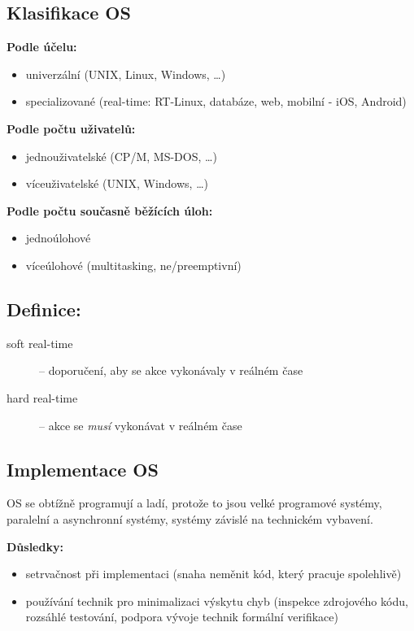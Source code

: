 \documentclass[a4paper, 11pt]{article}
\begin{document}
\newpage

\subsection{Klasifikace OS}

\textbf{Podle účelu:}
\begin{itemize}
    \item univerzální (UNIX, Linux, Windows, \ldots)
    \item specializované (real-time: RT-Linux, databáze, web, mobilní - iOS, Android)
\end{itemize}

\textbf{Podle počtu uživatelů:}
\begin{itemize}
    \item jednouživatelské (CP/M, MS-DOS, \ldots)
    \item víceuživatelské (UNIX, Windows, \ldots)
\end{itemize}

\textbf{Podle počtu současně běžících úloh:}
\begin{itemize}
    \item jednoúlohové
    \item víceúlohové (multitasking, ne/preemptivní)
\end{itemize}

\subsection*{Definice:}
\begin{description}
\item[soft real-time] -- doporučení, aby se akce vykonávaly v reálném čase
\item[hard real-time] -- akce se \emph{musí} vykonávat v reálném čase
\end{description}

\subsection{Implementace OS}
OS se obtížně programují a ladí, protože to jsou velké programové systémy, paralelní a asynchronní systémy, systémy závislé na technickém vybavení.
 
\textbf{Důsledky:}
\begin{itemize}
    \item setrvačnost při implementaci (snaha neměnit kód, který pracuje spolehlivě)
    \item používání technik pro minimalizaci výskytu chyb (inspekce zdrojového kódu, rozsáhlé testování, podpora vývoje technik formální verifikace)
\end{itemize}
\end{document}
